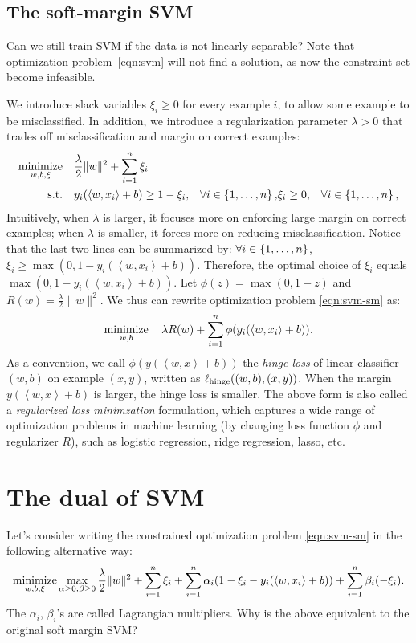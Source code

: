 \documentclass{article}
\DeclareMathOperator*{\hinge}{{\rm hinge}}
\DeclareMathOperator*{\minimize}{{\rm minimize}}
\DeclareMathOperator*{\st}{{\rm s.t.}}
\newcommand{\inner}[2]{\left\langle #1,#2 \right\rangle}
\begin{document}
\subsection{The soft-margin SVM}
Can we still train SVM if the data is not linearly separable? Note that optimization problem~\eqref{eqn:svm} will not find a solution, as now the constraint set become infeasible.

We introduce slack variables $\xi_i \geq 0$ for every example $i$, to allow some example to be misclassified. In addition, we introduce a regularization parameter
$\lambda > 0$ that trades off misclassification and margin on correct examples:
\begin{align}
  \minimize_{w,b,\xi} \quad & \frac \lambda 2 \| w \|^2 + \sum_{i=1}^n \xi_i & \label{eqn:svm-sm} \\
    \st \quad &  y_i(\inner{w}{x_i} + b) \geq 1 - \xi_i, &\forall i \in \cbr{1,\ldots,n}, \nonumber
    &  \xi_i \geq 0, &\forall i \in \cbr{1,\ldots,n}, \nonumber
\end{align}
Intuitively, when $\lambda$ is larger, it focuses more on enforcing large margin on correct examples; when $\lambda$ is smaller, it forces more on reducing misclassification.
Notice that the last two lines can be summarized by: $\forall i \in \cbr{1,\ldots,n}$, $\xi_i \geq \max(0, 1-y_i(\inner{w}{x_i} + b))$. Therefore, the optimal choice of $\xi_i$ equals $\max(0, 1-y_i(\inner{w}{x_i} + b))$.
Let $\phi(z) = \max(0,1-z)$ and $R(w) = \frac{\lambda}{2}\| w \|^2$. We thus can rewrite optimization problem \eqref{eqn:svm-sm} as:
\begin{equation}
    \minimize_{w,b} \quad \lambda R(w)  + \sum_{i=1}^n \phi(y_i(\inner{w}{x_i} + b)).
\end{equation}
As a convention, we call $\phi(y(\inner{w}{x} + b))$ the {\em hinge loss} of linear classifier $(w,b)$ on example $(x,y)$, written as $\ell_{\hinge}((w,b), (x,y))$. When the margin $y(\inner{w}{x} + b)$ is larger, the hinge loss is smaller. The above form is also called a {\em regularized loss minimzation} formulation, which captures a wide range of optimization problems in machine learning (by changing loss function $\phi$ and regularizer $R$), such as logistic regression, ridge regression, lasso, etc.

\section{The dual of SVM}
Let's consider writing the constrained optimization problem \eqref{eqn:svm-sm} in the following alternative way:
\begin{align}
   \minimize_{w,b,\xi} \max_{\alpha \geq 0, \beta \geq 0} \frac \lambda 2 \| w \|^2 + \sum_{i=1}^n \xi_i + \sum_{i=1}^n \alpha_i (1 - \xi_i - y_i(\inner{w}{x_i} + b)) + \sum_{i=1}^n \beta_i (-\xi_i).
\end{align}
The $\alpha_i$, $\beta_i$'s are called Lagrangian multipliers. Why is the above equivalent to the original soft margin SVM?
\end{document}
